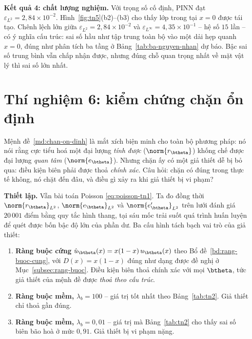 \textbf{Kết quả 4: chất lượng nghiệm.} Với trọng số cố định, PINN đạt
$\varepsilon_{L^2} = 2{,}84\times10^{-2}$.
Hình~\ref{fig:tn5}(b2)--(b3) cho thấy lớp trong tại $x = 0$ được tái tạo. Chênh
lệch lớn giữa $\varepsilon_{L^2} = 2{,}84\times10^{-2}$ và
$\varepsilon_{L^{\infty}} = 4{,}35\times10^{-1}$ -- hệ số $15$ lần -- có ý nghĩa
cấu trúc: sai số hầu như tập trung toàn bộ vào một dải hẹp quanh $x = 0$, đúng như
phân tích ba tầng ở Bảng~\ref{tab:ba-nguyen-nhan} dự báo. Bậc sai số trung bình
vẫn chấp nhận được, nhưng đúng chỗ quan trọng nhất về mặt vật lý thì sai số lớn
nhất.
 
\section{Thí nghiệm 6: kiểm chứng chặn ổn định}
\label{sec:tn6}

\begin{thinghiem}
\label{tn:chan}
Mệnh đề~\ref{md:chan-on-dinh} là mắt xích biện minh cho toàn bộ phương pháp: nó
nói rằng cực tiểu hoá một đại lượng \emph{tính được} ($\norm{r_{\btheta}}$) khống
chế được đại lượng \emph{quan tâm} ($\norm{e_{\btheta}}$). Nhưng chặn ấy có một
giả thiết dễ bị bỏ qua: điều kiện biên phải được thoả \emph{chính xác}. Câu hỏi:
chặn có đúng trong thực tế không, nó chặt đến đâu, và điều gì xảy ra khi giả
thiết bị vi phạm?
\end{thinghiem}

\textbf{Thiết lập.} Vẫn bài toán Poisson \eqref{eq:poisson-tn1}. Ta đo đồng thời
$\norm{r_{\btheta}}_{L^2}$, $\norm{e_{\btheta}}_{L^2}$ và
$\norm{e_{\btheta}'}_{L^2}$ trên lưới đánh giá $20\,001$ điểm bằng quy tắc hình
thang, tại sáu mốc trải suốt quá trình huấn luyện để quét được bốn bậc độ lớn
của phần dư. Ba cấu hình tách bạch vai trò của giả thiết:

\begin{enumerate}[label=(\alph*),leftmargin=2.2em,itemsep=2pt]
\item \textbf{Ràng buộc cứng} $\hat u_{\btheta}(x) = x(1-x)\,u_{\btheta}(x)$ theo
Bổ đề~\ref{bd:rang-buoc-cung}, với $D(x) = x(1-x)$ đúng như dạng được đề nghị ở
Mục~\ref{subsec:rang-buoc}. Điều kiện biên thoả chính xác với mọi $\btheta$, tức
giả thiết của mệnh đề được \emph{thoả theo cấu trúc}.
\item \textbf{Ràng buộc mềm, $\lambda_b = 100$} -- giá trị tốt nhất theo
Bảng~\ref{tab:tn2}. Giả thiết chỉ thoả gần đúng.
\item \textbf{Ràng buộc mềm, $\lambda_b = 0{,}01$} -- giá trị mà
Bảng~\ref{tab:tn2} cho thấy sai số biên bão hoà ở mức $0{,}91$. Giả thiết bị vi
phạm nặng.
\end{enumerate}

